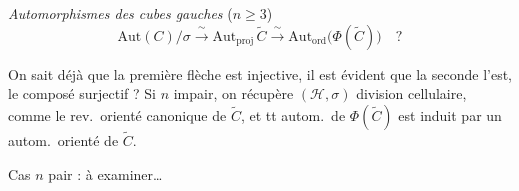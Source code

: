 \documentclass[11pt,a4paper]{article}
\begin{document}
\emph{Automorphismes des cubes gauches} ($n \geqslant 3$)
\[
  \mathrm{Aut}(C)/\sigma \xrightarrow{\ \sim\ }
  \mathrm{Aut}_{\mathrm{proj}}\,\widetilde{C} \xrightarrow{\ \sim\ }
  \mathrm{Aut}_{\mathrm{ord}}\bigl(\Phi(\widetilde{C})\bigr) \quad ?
\]

On sait déjà que la première flèche est injective, il est évident que la
seconde l'est, le composé  \struck{\ill{}} surjectif ?
Si $n$ impair, on récupère $(\mathcal{H}, \sigma)$ 
division cellulaire, comme le rev.\ orienté canonique de $\widetilde{C}$,
et tt autom.\ de $\Phi(\widetilde{C})$ est induit par un autom.\ orienté de
$\widetilde{C}$.

Cas $n$ pair : à examiner\ldots
{}
\end{document}
